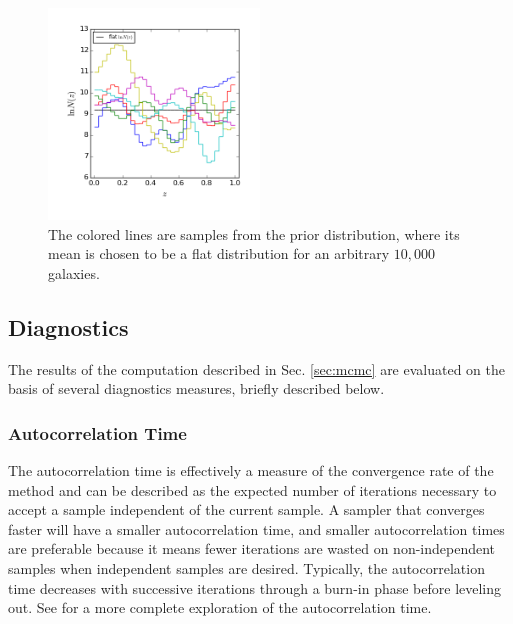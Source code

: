\documentclass[preprint]{aastex}
\begin{document}
\begin{figure}
\includegraphics[width=0.5\textwidth]{figs/null/priorsamps.png}
\caption{The colored lines are samples from the prior distribution, where its 
mean is chosen to be a flat distribution for an arbitrary $10,000$ galaxies.}
\label{fig:prior}
\end{figure}

\clearpage
\subsection{Diagnostics}
\label{sec:diag}

The results of the computation described in Sec. \ref{sec:mcmc} are evaluated 
on the basis of several diagnostics measures, briefly described below.

\subsubsection{Autocorrelation Time}
\label{sec:acorr}

The autocorrelation time is effectively a measure of the convergence rate of 
the method and can be described as the expected number of iterations necessary 
to accept a sample independent of the current sample.  A sampler that converges 
faster will have a smaller autocorrelation time, and smaller autocorrelation 
times are preferable because it means fewer iterations are wasted on 
non-independent samples when independent samples are desired.  Typically, the 
autocorrelation time decreases with successive iterations through a burn-in 
phase before leveling out.  See \citet{Foreman-Mackey2013} for a more complete 
exploration of the autocorrelation time.
\end{document}
